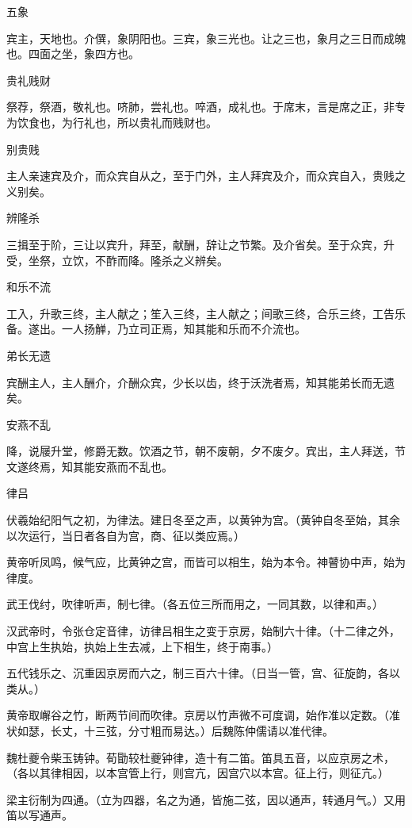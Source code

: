 \documentclass[a4paper,12pt,UTF8,twoside]{ctexbook}
\begin{document}
    五象
    
    宾主，天地也。介僎，象阴阳也。三宾，象三光也。让之三也，象月之三日而成魄也。四面之坐，象四方也。
    
    贵礼贱财
    
    祭荐，祭酒，敬礼也。哜肺，尝礼也。啐酒，成礼也。于席末，言是席之正，非专为饮食也，为行礼也，所以贵礼而贱财也。
    
    别贵贱
    
    主人亲速宾及介，而众宾自从之，至于门外，主人拜宾及介，而众宾自入，贵贱之义别矣。
    
    辨隆杀
    
    三揖至于阶，三让以宾升，拜至，献酬，辞让之节繁。及介省矣。至于众宾，升受，坐祭，立饮，不酢而降。隆杀之义辨矣。
    
    和乐不流
    
    工入，升歌三终，主人献之；笙入三终，主人献之；间歌三终，合乐三终，工告乐备。遂出。一人扬觯，乃立司正焉，知其能和乐而不介流也。
    
    弟长无遗
    
    宾酬主人，主人酬介，介酬众宾，少长以齿，终于沃洗者焉，知其能弟长而无遗矣。
    
    安燕不乱
    
    降，说屦升堂，修爵无数。饮酒之节，朝不废朝，夕不废夕。宾出，主人拜送，节文遂终焉，知其能安燕而不乱也。
    
    律吕
    
    伏羲始纪阳气之初，为律法。建日冬至之声，以黄钟为宫。（黄钟自冬至始，其余以次运行，当日者各自为宫，商、征以类应焉。）
    
    黄帝听凤鸣，候气应，比黄钟之宫，而皆可以相生，始为本令。神瞽协中声，始为律度。
    
    武王伐纣，吹律听声，制七律。（各五位三所而用之，一同其数，以律和声。）
    
    汉武帝时，令张仓定音律，访律吕相生之变于京房，始制六十律。（十二律之外，中宫上生执始，执始上生去减，上下相生，终于南事。）
    
    五代钱乐之、沉重因京房而六之，制三百六十律。（日当一管，宫、征旋韵，各以类从。）
    
    黄帝取嶰谷之竹，断两节间而吹律。京房以竹声微不可度调，始作准以定数。（准状如瑟，长丈，十三弦，分寸粗而易达。）后魏陈仲儒请以准代律。
    
    魏杜夔令柴玉铸钟。荀勖较杜夔钟律，造十有二笛。笛具五音，以应京房之术，（各以其律相因，以本宫管上行，则宫亢，因宫穴以本宫。征上行，则征亢。）
    
    梁主衍制为四通。（立为四器，名之为通，皆施二弦，因以通声，转通月气。）又用笛以写通声。
    
\end{document}
